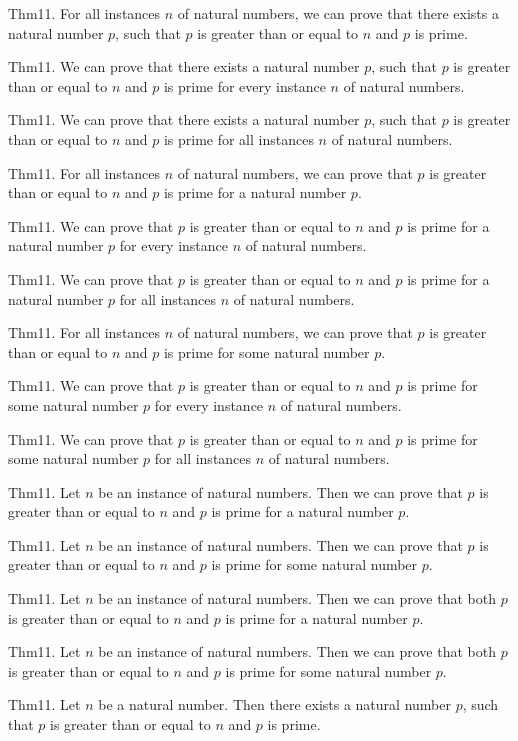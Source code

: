 \documentclass{article}
\begin{document}
Thm11. For all instances $n$ of natural numbers, we can prove that there exists a natural number $p$, such that $p$ is greater than or equal to $n$ and $p$ is prime.

Thm11. We can prove that there exists a natural number $p$, such that $p$ is greater than or equal to $n$ and $p$ is prime for every instance $n$ of natural numbers.

Thm11. We can prove that there exists a natural number $p$, such that $p$ is greater than or equal to $n$ and $p$ is prime for all instances $n$ of natural numbers.

Thm11. For all instances $n$ of natural numbers, we can prove that $p$ is greater than or equal to $n$ and $p$ is prime for a natural number $p$.

Thm11. We can prove that $p$ is greater than or equal to $n$ and $p$ is prime for a natural number $p$ for every instance $n$ of natural numbers.

Thm11. We can prove that $p$ is greater than or equal to $n$ and $p$ is prime for a natural number $p$ for all instances $n$ of natural numbers.

Thm11. For all instances $n$ of natural numbers, we can prove that $p$ is greater than or equal to $n$ and $p$ is prime for some natural number $p$.

Thm11. We can prove that $p$ is greater than or equal to $n$ and $p$ is prime for some natural number $p$ for every instance $n$ of natural numbers.

Thm11. We can prove that $p$ is greater than or equal to $n$ and $p$ is prime for some natural number $p$ for all instances $n$ of natural numbers.

Thm11. Let $n$ be an instance of natural numbers. Then we can prove that $p$ is greater than or equal to $n$ and $p$ is prime for a natural number $p$.

Thm11. Let $n$ be an instance of natural numbers. Then we can prove that $p$ is greater than or equal to $n$ and $p$ is prime for some natural number $p$.

Thm11. Let $n$ be an instance of natural numbers. Then we can prove that both $p$ is greater than or equal to $n$ and $p$ is prime for a natural number $p$.

Thm11. Let $n$ be an instance of natural numbers. Then we can prove that both $p$ is greater than or equal to $n$ and $p$ is prime for some natural number $p$.

Thm11. Let $n$ be a natural number. Then there exists a natural number $p$, such that $p$ is greater than or equal to $n$ and $p$ is prime.
\end{document}
